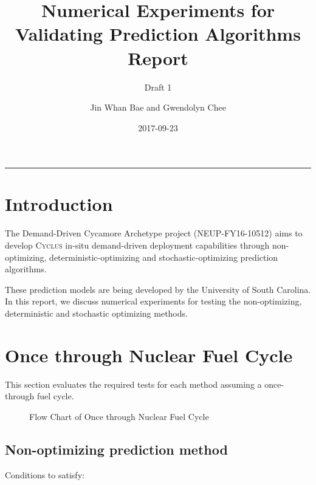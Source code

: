 \documentclass[12pt,letterpaper]{article}
\title{Numerical Experiments for Validating Prediction Algorithms Report}
\subtitle{Draft 1}
\author{Jin Whan Bae and Gwendolyn Chee}
\date{2017-09-23}
\newcommand{\Cyclus}{\textsc{Cyclus}\xspace}%
\begin{document}
	
	\maketitle
	\hrule
	\onehalfspacing
	\thispagestyle{empty}

\section*{Introduction}
The Demand-Driven Cycamore Archetype project (NEUP-FY16-10512) aims to develop \Cyclus in-situ demand-driven deployment capabilities through non-optimizing, deterministic-optimizing and stochastic-optimizing prediction algorithms.

These prediction models are being developed by the University of South Carolina. In this report, we discuss numerical experiments for testing the non-optimizing, deterministic and stochastic optimizing methods. 

\section{Once through Nuclear Fuel Cycle}
This section evaluates the required tests for
each method assuming a once-through fuel cycle.

\begin{figure}[H]
\caption{Flow Chart of Once through Nuclear Fuel Cycle}
\end{figure}

\subsection{Non-optimizing prediction method}
Conditions to satisfy: 
\end{document}
